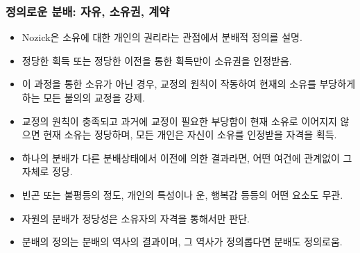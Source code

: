 \documentclass[aspectratio=169,xcolor=dvipsnames,handout]{beamer}
\begin{document}
\begin{frame}[allowframebreaks]
\frametitle{정의로운 분배: 자유, 소유권, 계약}
    \begin{itemize}
        \item Nozick은 소유에 대한 개인의 권리라는 관점에서 분배적 정의를 설명.
        \item 정당한 획득 또는 정당한 이전을 통한 획득만이 소유권을 인정받음.
        \item 이 과정을 통한 소유가 아닌 경우, 교정의 원칙이 작동하여 현재의 소유를 부당하게 하는 모든 불의의 교정을 강제.
        \item 교정의 원칙이 충족되고 과거에 교정이 필요한 부당함이 현재 소유로 이어지지 않으면 현재 소유는 정당하며, 모든 개인은 자신이 소유를 인정받을 자격을 획득.
    \framebreak%
        \item 하나의 분배가 다른 분배상태에서 이전에 의한 결과라면, 어떤 여건에 관계없이 그 자체로 정당.
        \item 빈곤 또는 불평등의 정도, 개인의 특성이나 운, 행복감 등등의 어떤 요소도 무관.
        \item 자원의 분배가 정당성은 소유자의 자격을 통해서만 판단.
        \item 분배의 정의는 분배의 역사의 결과이며, 그 역사가 정의롭다면 분배도 정의로움.
    \end{itemize}
\end{frame}
\end{document}
